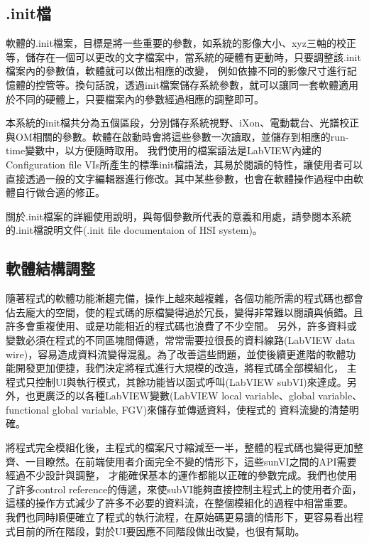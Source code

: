 \documentclass[12pt]{article}
\begin{document}
\subsection{.init檔}
軟體的.init檔案，目標是將一些重要的參數，如系統的影像大小、xyz三軸的校正等，儲存在一個可以更改的文字檔案中，當系統的硬體有更動時，只要調整該.init檔案內的參數值，軟體就可以做出相應的改變，
例如依據不同的影像尺寸進行記憶體的控管等。換句話說，透過init檔案儲存系統參數，就可以讓同一套軟體適用於不同的硬體上，只要檔案內的參數經過相應的調整即可。

本系統的init檔共分為五個區段，分別儲存系統視野、iXon、電動載台、光譜校正與OM相關的參數。軟體在啟動時會將這些參數一次讀取，並儲存到相應的run-time變數中，以方便隨時取用。
我們使用的檔案語法是LabVIEW內建的Configuration file VIs所產生的標準init檔語法，其易於閱讀的特性，讓使用者可以直接透過一般的文字編輯器進行修改。其中某些參數，也會在軟體操作過程中由軟體自行做合適的修正。

關於.init檔案的詳細使用說明，與每個參數所代表的意義和用處，請參閱本系統的.init檔說明文件(.init file documentaion of HSI system)。
\subsection{軟體結構調整}
隨著程式的軟體功能漸趨完備，操作上越來越複雜，各個功能所需的程式碼也都會佔去龐大的空間，使的程式碼的原檔變得過於冗長，變得非常難以閱讀與偵錯。且許多會重複使用、或是功能相近的程式碼也浪費了不少空間。
另外，許多資料或變數必須在程式的不同區塊間傳遞，常常需要拉很長的資料線路(LabVIEW data wire)，容易造成資料流變得混亂。為了改善這些問題，並使後續更進階的軟體功能開發更加便捷，我們決定將程式進行大規模的改造，將程式碼全部模組化，
主程式只控制UI與執行模式，其餘功能皆以函式呼叫(LabVIEW subVI)來達成。另外，也更廣泛的以各種LabVIEW變數(LabVIEW local variable、global variable、functional global variable, FGV)來儲存並傳遞資料，使程式的
資料流變的清楚明確。

將程式完全模組化後，主程式的檔案尺寸縮減至一半，整體的程式碼也變得更加整齊、一目瞭然。在前端使用者介面完全不變的情形下，這些sunVI之間的API需要經過不少設計與調整，
才能確保基本的運作都能以正確的參數完成。我們也使用了許多control reference的傳遞，來使subVI能夠直接控制主程式上的使用者介面，這樣的操作方式減少了許多不必要的資料流，在整個模組化的過程中相當重要。
我們也同時順便確立了程式的執行流程，在原始碼更易讀的情形下，更容易看出程式目前的所在階段，對於UI要因應不同階段做出改變，也很有幫助。
\end{document}
